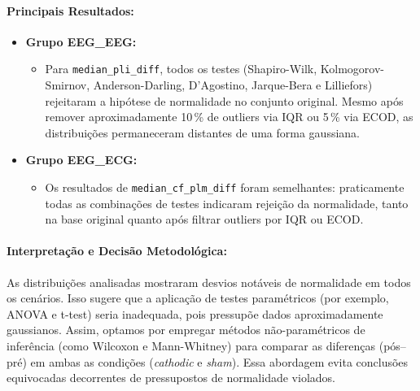 \paragraph{Principais Resultados:}
\begin{itemize}
    \item \textbf{Grupo EEG\_EEG:}
    \begin{itemize}
        \item Para \texttt{median\_pli\_diff}, todos os testes (Shapiro-Wilk, Kolmogorov-Smirnov, Anderson-Darling, D'Agostino, Jarque-Bera e Lilliefors) rejeitaram a hipótese de normalidade no conjunto original. Mesmo após remover aproximadamente 10\,\% de outliers via IQR ou 5\,\% via ECOD, as distribuições permaneceram distantes de uma forma gaussiana.
    \end{itemize}
    \item \textbf{Grupo EEG\_ECG:}
    \begin{itemize}
        \item Os resultados de \texttt{median\_cf\_plm\_diff} foram semelhantes: praticamente todas as combinações de testes indicaram rejeição da normalidade, tanto na base original quanto após filtrar outliers por IQR ou ECOD.
    \end{itemize}
\end{itemize}

\paragraph{Interpretação e Decisão Metodológica:}
As distribuições analisadas mostraram desvios notáveis de normalidade em todos os cenários. Isso sugere que a aplicação de testes paramétricos (por exemplo, ANOVA e t-test) seria inadequada, pois pressupõe dados aproximadamente gaussianos. Assim, optamos por empregar métodos não-paramétricos de inferência (como Wilcoxon e Mann-Whitney) para comparar as diferenças (pós--pré) em ambas as condições (\emph{cathodic} e \emph{sham}). Essa abordagem evita conclusões equivocadas decorrentes de pressupostos de normalidade violados.